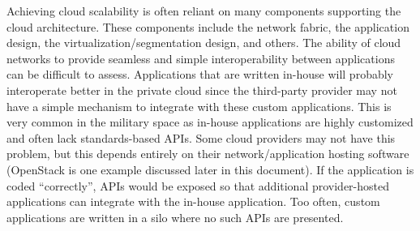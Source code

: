 Achieving cloud scalability is often reliant on many components supporting the
cloud architecture. These components include the network fabric, the
application design, the virtualization/segmentation design, and others. The
ability of cloud networks to provide seamless and simple interoperability
between applications can be difficult to assess. Applications that are written
in-house will probably interoperate better in the private cloud since the
third-party provider may not have a simple mechanism to integrate with these
custom applications. This is very common in the military space as in-house
applications are highly customized and often lack standards-based APIs. Some
cloud providers may not have this problem, but this depends entirely on their
network/application hosting software (OpenStack is one example discussed later
in this document). If the application is coded ``correctly'', APIs would be
exposed so that additional provider-hosted applications can integrate with the
in-house application. Too often, custom applications are written in a silo
where no such APIs are presented. \\


